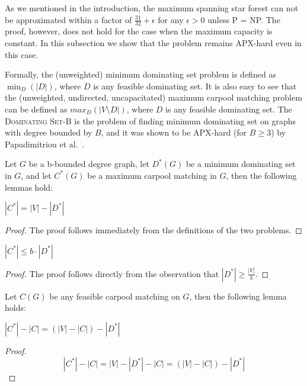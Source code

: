 As we mentioned in the introduction, the maximum spanning star forest can not 
be approximated within a factor of 
$\frac{31}{32} + \epsilon$ for any $\epsilon > 0$ unless P = NP.
The proof, however, does not hold for the case when the maximum capacity is
constant. 
In this subsection we show that the problem remains APX-hard even in this case.

Formally, the (unweighted)
minimum dominating set problem is defined as $\min_{D}(|D|)$,
where $D$ is any feasible dominating set.
It is also easy to see that the (unweighted, undirected, uncapacitated) 
maximum carpool matching problem can be defined as $max_{D}(|V \setminus D|)$, 
where $D$ is any feasible dominating set.
The \textsc{Dominating Set-B} is the problem of finding minimum dominating set on 
graphs with degree bounded by $B$,
and it was shown to be APX-hard (for $B \geq 3$) by 
Papadimitriou et al.~\cite{papadimitriou1988optimization}.

Let $G$ be a b-bounded degree graph,
let $D^*(G)$ be a minimum dominating set in $G$,
and let $C^*(G)$ be a maximum carpool matching in $G$, 
then the following lemmas hold:

\begin{lemma}
$|C^*| = |V| - |D^*|$
\end{lemma}

\begin{proof}
The proof follows immediately from the definitions of the two problems. 
\end{proof}

\begin{lemma}
\label{lm:optc_leq_boptd}
$|C^*| \leq b \cdot |D^*|$
\end{lemma}

\begin{proof}
The proof follows directly from the observation that $|D^*| \geq \frac{|V|}{b}$.
\end{proof}

Let $C(G)$ be any feasible carpool matching on $G$, then the following lemma holds:

\begin{lemma}
\label{lm:erreq}
$|C^*| - |C| = (|V| - |C|) - |D^*|$
\end{lemma}

\begin{proof}
$$
|C^*| - |C| 				= 
|V| - |D^*| - |C| 	= 
(|V| - |C|) - |D^*|
$$
\end{proof}

